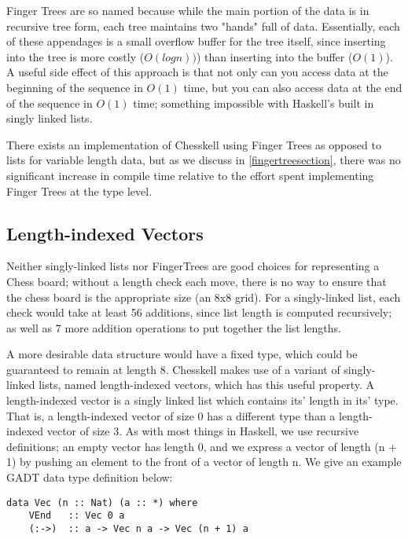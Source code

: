 Finger Trees are so named because while the main portion of the data is in recursive tree form, each tree maintains two "hands" full of data. Essentially, each of these appendages is a small overflow buffer for the tree itself, since inserting into the tree is more costly ($O(log n))$) than inserting into the buffer ($O(1)$). A useful side effect of this approach is that not only can you access data at the beginning of the sequence in $O(1)$ time, but you can also access data at the end of the sequence in $O(1)$ time; something impossible with Haskell's built in singly linked lists.

There exists an implementation of Chesskell using Finger Trees as opposed to lists for variable length data, but as we discuss in \cref{fingertreesection}, there was no significant increase in compile time relative to the effort spent implementing Finger Trees at the type level.

\subsection{Length-indexed Vectors} \label{lengthindexedvectors}

Neither singly-linked lists nor FingerTrees are good choices for representing a Chess board; without a length check each move, there is no way to ensure that the chess board is the appropriate size (an 8x8 grid). For a singly-linked list, each check would take at least 56 additions, since list length is computed recursively; as well as 7 more addition operations to put together the list lengths.

A more desirable data structure would have a fixed type, which could be guaranteed to remain at length 8. Chesskell makes use of a variant of singly-linked lists, named length-indexed vectors, which has this useful property. A length-indexed vector is a singly linked list which contains its' length in its' type. That is, a length-indexed vector of size 0 has a different type than a length-indexed vector of size 3. As with most things in Haskell, we use recursive definitions; an empty vector has length 0, and we express a vector of length (n + 1) by pushing an element to the front of a vector of length n. We give an example GADT data type definition below:

\begin{lstlisting}
data Vec (n :: Nat) (a :: *) where
    VEnd   :: Vec 0 a
    (:->)  :: a -> Vec n a -> Vec (n + 1) a
\end{lstlisting}

